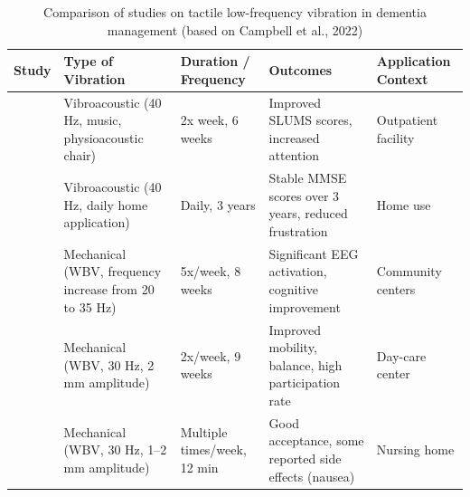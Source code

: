 \begin{table}[htbp]
	\centering
	\caption{Comparison of studies on tactile low-frequency vibration in dementia management (based on Campbell et al., 2022)}
	\label{tab:vibration-studies}
	\begin{tabular}{p{0.5cm} p{3.2cm} p{2.5cm} p{4cm} p{2.5cm}}
		\hline
		\textbf{Study}             & \textbf{Type of Vibration}                         & \textbf{Duration / Frequency} & \textbf{Outcomes}                                    & \textbf{Application Context} \\
		\hline
		\cite{ClementsCortes.2016} & Vibroacoustic (40 Hz, music, physioacoustic chair) & 2x week, 6 weeks              & Improved SLUMS scores, increased attention           & Outpatient facility          \\

		\cite{ClementsCortes.2017} & Vibroacoustic (40 Hz, daily home application)      & Daily, 3 years                & Stable MMSE scores over 3 years, reduced frustration & Home use                     \\

		\cite{Kim.2018}            & Mechanical (WBV, frequency increase from 20 to 35 Hz) & 5x/week, 8 weeks              & Significant EEG activation, cognitive improvement    & Community centers            \\

		\cite{Lam.2018}            & Mechanical (WBV, 30 Hz, 2 mm amplitude)            & 2x/week, 9 weeks              & Improved mobility, balance, high participation rate  & Day-care center              \\

		\cite{Heesterbeek.2019}    & Mechanical (WBV, 30 Hz, 1–2 mm amplitude)          & Multiple times/week, 12 min   & Good acceptance, some reported side effects (nausea) & Nursing home                 \\
		\hline
	\end{tabular}
\end{table}
